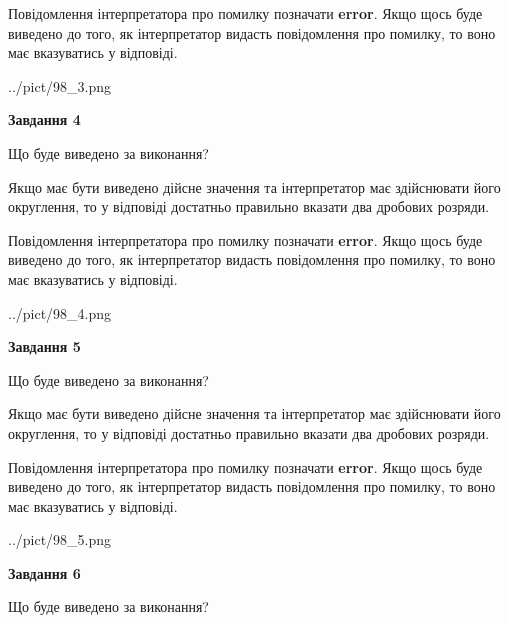 \documentclass[12pt, ukrainian]{article}
\begin{document}
{\begin {Large}
Повідомлення інтерпретатора про помилку позначати \textbf{error}.
Якщо щось буде виведено до того, як інтерпретатор видасть повідомлення про помилку, 
то воно має вказуватись у відповіді. \par

\begin{center}
	{../pict/98_3.png}
\end{center}
\newpage

{\begin {center}\textbf{Завдання 4}\end {center}}\par
Що буде виведено за виконання? \par

Якщо має бути виведено дійсне значення та інтерпретатор має здійснювати його округлення, 
то у відповіді достатньо правильно вказати два дробових розряди.

Повідомлення інтерпретатора про помилку позначати \textbf{error}.
Якщо щось буде виведено до того, як інтерпретатор видасть повідомлення про помилку, 
то воно має вказуватись у відповіді. \par

\begin{center}
	{../pict/98_4.png}
\end{center}
\newpage

{\begin {center}\textbf{Завдання 5}\end {center}}\par
Що буде виведено за виконання? \par

Якщо має бути виведено дійсне значення та інтерпретатор має здійснювати його округлення, 
то у відповіді достатньо правильно вказати два дробових розряди.

Повідомлення інтерпретатора про помилку позначати \textbf{error}.
Якщо щось буде виведено до того, як інтерпретатор видасть повідомлення про помилку, 
то воно має вказуватись у відповіді. \par

\begin{center}
	{../pict/98_5.png}
\end{center}
\newpage

{\begin {center}\textbf{Завдання 6}\end {center}}\par
Що буде виведено за виконання? \par


\end{Large}}
\end{document}
